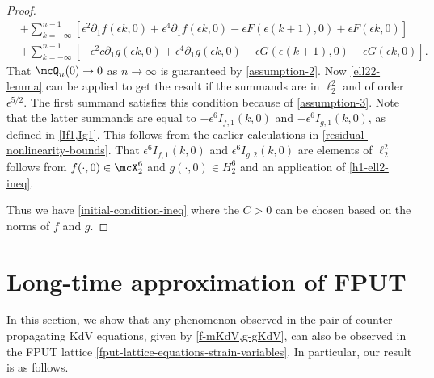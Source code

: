\documentclass[oneside,reqno]{amsart}
\begin{document}
\begin{proof}
\begin{equation*}
\begin{aligned}
			&+\sum_{k=-\infty}^{n-1}\left[  \epsilon^2 \partial_1 f(\epsilon k,0) +\epsilon^4 \partial_1 f(\epsilon k,0) - \epsilon F(\epsilon(k+1),0) +\epsilon F(\epsilon k ,0)  \right] \\
			&+ \sum_{k=-\infty}^{n-1}\left[ - \epsilon^2 c\partial_1 g(\epsilon k,0) +\epsilon^4 \partial_1 g(\epsilon k,0) - \epsilon G(\epsilon(k+1),0) +\epsilon G(\epsilon k ,0)  \right].
		\end{aligned}
	\end{equation*}
	That \(\mcQ_n(0)\to 0\) as \(n\to\infty\) is guaranteed by \cref{assumption-2}. Now \cref{ell22-lemma} can be applied to get the result if the summands are in \(\ell^2_2\) and of order \(\epsilon^{5/2}\). The first summand satisfies this condition because of \cref{assumption-3}.  Note that the latter summands are equal to \(-\epsilon^6 I_{f,1}(k,0)\) and \(-\epsilon^6 I_{g,1}(k,0)\), as defined in \cref{If1,Ig1}. This follows from the earlier calculations in \cref{residual-nonlinearity-bounds}. That \(\epsilon^6 I_{f,1}(k,0)\) and \(\epsilon^6 I_{g,2}(k,0)\) are elements of \(\ell^2_2\) follows from \(f(\cdot, 0) \in \mcX^6_2\) and \(g(\cdot, 0) \in H^6_2\) and an application of \cref{h1-ell2-ineq}.
	
	Thus we have \cref{initial-condition-ineq} where the \(C>0\) can be chosen based on the norms of \(f\) and \(g\).
\end{proof}

\section{Long-time approximation of FPUT}\label{sec:long-time-approx}

In this section, we show that any phenomenon observed in the pair of counter propagating KdV equations, given by \cref{f-mKdV,g-gKdV}, can also be observed in the FPUT lattice \cref{fput-lattice-equations-strain-variables}. In particular, our result is as follows.
\end{document}

